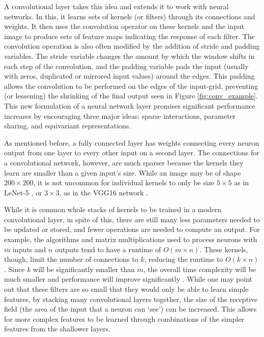 \documentclass[11pt,a4paper,oldfontcommands]{memoir}
\begin{document}
A convolutional layer takes this idea and extends it to work with neural networks. In this, it learns sets of kernels (or filters) through its connections and weights. It then uses the convolution operator on these kernels and the input image to produce sets of feature maps indicating the response of each filter. The convolution operation is also often modified by the addition of stride and padding variables. The stride variable changes the amount by which the window shifts in each step of the convolution, and the padding variable pads the input (usually with zeros, duplicated or mirrored input values) around the edges. This padding allows the convolution to be performed on the edges of the input-grid, preventing (or lessening) the shrinking of the final output seen in Figure \ref{fig:conv_example}. This new formulation of a neural network layer promises significant performance increases by encouraging three major ideas: sparse interactions, parameter sharing, and equivariant representations. 

As mentioned before, a fully connected layer has weights connecting every neuron output from one layer to every other input on a second layer. The connections for a convolutional network, however, are much sparser because the kernels they learn are smaller than a given input's size. While an image may be of shape $200 \times 200$, it is not uncommon for individual kernels to only be size $5 \times 5$ as in LeNet-5 \cite{lenet5}, or $3 \times 3$, as in the VGG16 network \cite{vgg16}. 

While it is common whole stacks of kernels to be trained in a modern convolutional layer, in spite of this, there are still many less parameters needed to be updated or stored, and fewer operations are needed to compute an output. For example, the algorithms and matrix multiplications used to process neurons with $m$ inputs and $n$ outputs tend to have a runtime of $O(m \times n)$. These kernels, though, limit the number of connections to $k$, reducing the runtime to $O(k \times n)$. Since $k$ will be significantly smaller than $m$, the overall time complexity will be much smaller and performance will improve significantly \cite{dl_book}. While one may point out that these filters are so small that they would only be able to learn simple features, by stacking many convolutional layers together, the size of the receptive field (the area of the input that a neuron can `see') can be increased. This allows for more complex features to be learned through combinations of the simpler features from the shallower layers.
\end{document}

